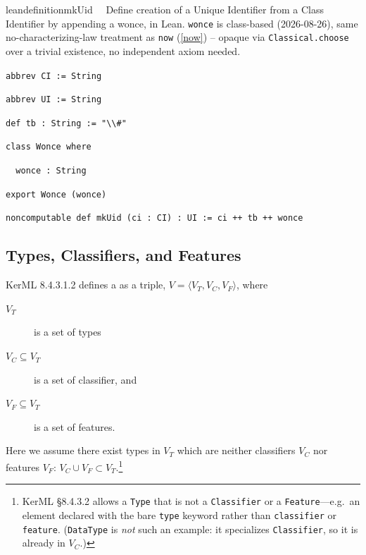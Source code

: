 \begin{restatable}{leandefinition}{mkUid}~~ Define creation of a Unique Identifier from a
Class Identifier by appending a wonce, in Lean. \texttt{wonce} is class-based (2026-08-26), same
no-characterizing-law treatment as \texttt{now} (\ref{now}) -- opaque via \texttt{Classical.choose} over a
trivial existence, no independent axiom needed.

\texttt{\textcolor{leancolor}{abbrev} \textcolor{leanyellow}{CI} := String}

\texttt{\textcolor{leancolor}{abbrev} \textcolor{leanyellow}{UI} := String}

\texttt{\textcolor{leancolor}{def} \textcolor{leanyellow}{tb} : String := "\textbackslash\textbackslash\#"}

\texttt{\textcolor{leancolor}{class} \textcolor{leanyellow}{Wonce} \textcolor{leancolor}{where}}

\texttt{~~wonce : String}

\texttt{\textcolor{leancolor}{export} Wonce (wonce)}

\texttt{\textcolor{leancolor}{noncomputable def} \textcolor{leanyellow}{mkUid} (ci : CI) : UI := ci ++ tb ++ wonce}
\label{mkUid}
\end{restatable}


\subsection{Types, Classifiers, and Features}

\pn KerML 8.4.3.1.2 defines a  as a triple, $V=\langle V_T, V_C, V_F\rangle$, where
\begin{description}
\item[$V_T$ ] is a set of types 
\item[$V_C \subseteq V_T$ ] is a set of classifier, and
\item[$V_F \subseteq V_T$ ] is a set of features.
\end{description}


\pn Here we assume there exist types in $V_T$ which are neither classifiers $V_C$ nor features $V_F$:
$V_C \cup V_F \subset V_T$.\footnote{KerML \S8.4.3.2 allows a \texttt{Type} that is not a \texttt{Classifier} or a \texttt{Feature}---e.g.\ an element declared with the bare \texttt{type} keyword rather than \texttt{classifier} or \texttt{feature}.  (\texttt{DataType} is \emph{not} such an example: it specializes \texttt{Classifier}, so it is already in $V_C$.)}

